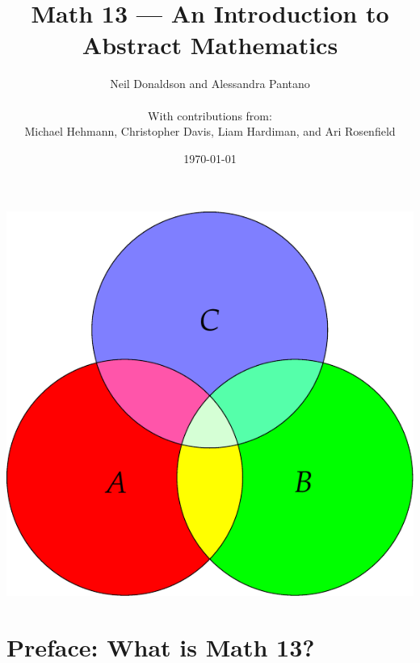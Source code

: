 \graphicspath{{1intro/asy}}


\title{Math 13 --- An Introduction to Abstract Mathematics}
\author{Neil Donaldson and Alessandra Pantano\\ \\ With contributions from:\\
Michael Hehmann, Christopher Davis, Liam Hardiman, and Ari Rosenfield}
\date{\today}
\maketitle
\thispagestyle{empty}

\vfill

\begin{center}
\includegraphics{intro-venndist}
\end{center}

\vfill\vfill\vfill

\clearpage




\tableofcontents

\clearpage

\section*{Preface: What is Math 13?}
\label{sec:preface}

